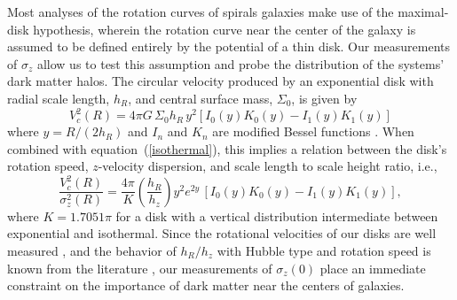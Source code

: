 \documentclass[12pt,preprint]{emulateapj}
\newcommand{\eg}{{e.g.,}}
\newcommand{\ie}{{i.e.,}}
\begin{document}
Most analyses of the rotation curves of spirals galaxies make use of the maximal-disk hypothesis, wherein the rotation curve near the center of the galaxy is assumed to be defined entirely by the potential of a thin disk.  Our measurements of $\sigma_z$ allow us to test this assumption and probe the distribution of the systems' dark matter halos.  The circular velocity produced by an exponential disk with radial scale length, $h_R$, and central surface mass, $\Sigma_0$, is given by
\begin{equation}
V_c^2(R) = 4\pi G \, \Sigma_0 h_R \, y^2 [I_0(y)K_0(y) - I_1(y)K_1(y)]
\label{disk_vc0}
\end{equation}
where $y = R/(2h_R)$ and $I_n$ and $K_n$ are modified Bessel functions \citep{f70, bt87}.  When combined with equation~(\ref{isothermal}), this implies a relation between the disk's rotation speed, $z$-velocity dispersion, and scale length to scale height ratio, \ie
\begin{equation}
\frac{V_c^2(R)}{\sigma_z^2(R)} = \frac{4\pi}{K} \left( \frac{h_R}{h_z} \right)
y^2 e^{2y} \, [I_0(y)K_0(y) - I_1(y)K_1(y)],
\label{disk_vc1}
\end{equation}
where $K = 1.7051\pi$ for a disk with a vertical distribution intermediate between exponential and isothermal.  Since the rotational velocities of our disks are well measured \citep{cth00, fb+07, p+01, dB+08, ZEH90}, and the behavior of $h_R/h_z$ with Hubble type and rotation speed is known from the literature \citep[\eg][]{dG98, kvd02, yd06}, our measurements of $\sigma_z(0)$ place an immediate constraint on the importance of dark matter near the centers of galaxies.  
\end{document}
